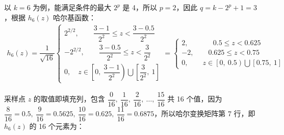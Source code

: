 \documentclass{article}
\begin{document}
以 $k=6$ 为例，能满足条件的最大 $2^p$ 是 4，所以 $p=2$，因此 $q=k-2^p+1=3$，根据 $h_6(z)$ 哈尔基函数：
\begin{align*}
    h_6(z)=\dfrac{1}{\sqrt{16}}\begin{cases}
        2^{2/2},\qquad \dfrac{3-1}{\displaystyle2^2}\leqslant z<\dfrac{3-0.5}{\displaystyle2^2}
        \\[10pt]
        -2^{2/2},\qquad \dfrac{3-0.5}{\displaystyle2^2}\leqslant z<\dfrac{3}{\displaystyle2^2}
        \\[10pt]
        0,\quad z\in\left[0,\ \dfrac{3-1}{\displaystyle2^2}\right)\bigcup\left[\dfrac{3}{\displaystyle2^2},\ 1\right]
    \end{cases}=\begin{cases}
        2,\qquad\quad\ \ 0.5\leqslant z<0.625
        \\[10pt]
        -2,\qquad 0.625\leqslant z<0.75
        \\[10pt]
        0,\qquad z\in\left[0,\ 0.5\right)\bigcup\left[0.75,\ 1\right]
    \end{cases}
\end{align*}

采样点 $z$ 的取值即填充列，包含 $\dfrac{0}{16},\ \dfrac{1}{16},\ \dfrac{2}{16},\ \ldots,\ \dfrac{15}{16}$ 共 16 个值，因为 $\dfrac{8}{16}=0.5,\ \dfrac{9}{16}=0.5625,\ \dfrac{10}{16}=0.625,\ \dfrac{11}{16}=0.6875$，所以哈尔变换矩阵第 7 行，即 $h_6(z)$ 的 16 个元素为：
\begin{align*}
    [0,\ 0,\ 0,\ 0,\ 0,\ 0,\ 0,\ 0,\ \dfrac{2}{4},\ \dfrac{2}{4}\ -\dfrac{2}{4},\ -\dfrac{2}{4},\ 0,\ 0,\ 0,\ 0]
\end{align*}
\end{document}
